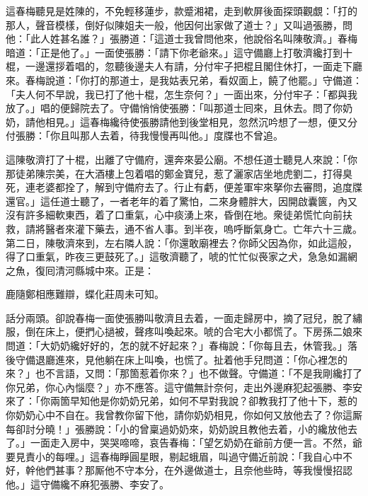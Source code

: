 這春梅聽見是姓陳的，{}不免輕移蓮步，款蹙湘裙，走到軟屏後面探頭觀覷：「打的那人，聲音模樣，倒好似陳姐夫一般，他因何出家做了道士？」又叫過張勝，問他：「此人姓甚名誰？」張勝道：「這道士我曾問他來，他說俗名叫陳敬濟。」春梅暗道：「正是他了。」{}一面使張勝：「請下你老爺來。」這守備廳上打敬濟纔打到十棍，一邊還拶着唱的，忽聽後邊夫人有請，分付牢子把棍且閣住休打，一面走下廳來。春梅說道：「你打的那道士，是我姑表兄弟，看奴面上，饒了他罷。」守備道：「夫人何不早說，我已打了他十棍，怎生奈何？」一面出來，分付牢子：「都與我放了。」唱的便歸院去了。守備悄悄使張勝：「叫那道士囘來，且休去。問了你奶奶，請他相見。」這春梅纔待使張勝請他到後堂相見，忽然沉吟想了一想，便又分付張勝：「你且叫那人去着，待我慢慢再叫他。」{}度牒也不曾追。

這陳敬濟打了十棍，出離了守備府，還奔來晏公廟。不想任道士聽見人來說：「你那徒弟陳宗美，在大酒樓上包着唱的鄭金寶兒，惹了灑家店坐地虎劉二，打得臭死，連老婆都拴了，解到守備府去了。行止有虧，便差軍牢來拏你去審問，追度牒還官。」這任道士聽了，一者老年的着了驚怕，二來身體胖大，因開啟囊篋，內又沒有許多細軟東西，着了口重氣，心中痰湧上來，昏倒在地。衆徒弟慌忙向前扶救，請將醫者來灌下藥去，通不省人事。到半夜，嗚呼斷氣身亡。亡年六十三歲。{}第二日，陳敬濟來到，左右隣人說：「你還敢廟裡去？你師父因為你，如此這般，得了口重氣，昨夜三更鼓死了。」這敬濟聽了，唬的忙忙似䘮家之犬，急急如漏網之魚，復囘清河縣城中來。正是：

\begin{myquote}
鹿隨鄭相應難辯，蝶化莊周未可知。
\end{myquote}

話分兩頭。卻說春梅一面使張勝叫敬濟且去着，一面走歸房中，摘了冠兒，脫了繡服，倒在床上，便捫心撾被，聲疼叫喚起來。{}唬的合宅大小都慌了。下房孫二娘來問道：「大奶奶纔好好的，怎的就不好起來？」春梅說：「你每且去，休管我。」落後守備退廳進來，見他躺在床上叫喚，也慌了。扯着他手兒問道：「你心裡怎的來？」也不言語，又問：「那箇惹着你來？」也不做聲。守備道：「不是我剛纔打了你兄弟，你心內惱麼？」亦不應答。{}這守備無計奈何，走出外邊麻犯起張勝、李安來了：「你兩箇早知他是你奶奶兄弟，如何不早對我說？卻教我打了他十下，惹的你奶奶心中不自在。我曾教你留下他，請你奶奶相見，你如何又放他去了？你這厮每卻討分曉！」張勝說：「小的曾稟過奶奶來，奶奶說且教他去着，小的纔放他去了。」一面走入房中，哭哭啼啼，哀告春梅：「望乞奶奶在爺前方便一言。不然，爺要見責小的每哩。」這春梅睜圓星眼，剔起蛾眉，叫過守備近前說：「我自心中不好，幹他們甚事？那厮他不守本分，在外邊做道士，且奈他些時，等我慢慢招認他。」{}這守備纔不麻犯張勝、李安了。

